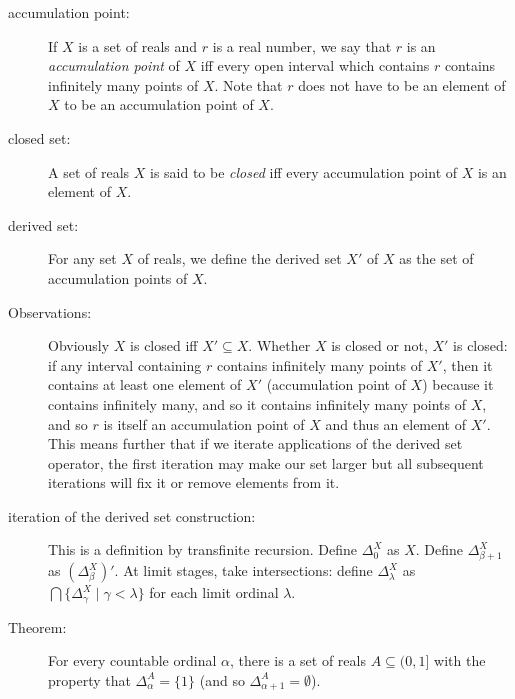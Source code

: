 \documentclass[12pt]{book}
\begin{document}
\begin{description}

\item[accumulation point:] If $X$ is a set of reals and $r$ is a real
number, we say that $r$ is an {\em accumulation point\/} of $X$ iff
every open interval which contains $r$ contains infinitely many points
of $X$.  Note that $r$ does not have to be an element of $X$ to be an
accumulation point of $X$.

\item[closed set:]  A set of reals $X$ is said to be {\em closed\/} iff
every accumulation point of $X$ is an element of $X$.

\item[derived set:] For any set $X$ of reals, we define the derived
set $X'$ of $X$ as the set of accumulation points of $X$.

\item[Observations:] Obviously $X$ is closed iff $X' \subseteq X$.
Whether $X$ is closed or not, $X'$ is closed: if any interval
containing $r$ contains infinitely many points of $X'$, then it
contains at least one element of $X'$ (accumulation point of $X$)
because it contains infinitely many, and so it contains infinitely
many points of $X$, and so $r$ is itself an accumulation point of $X$
and thus an element of $X'$.  This means further that if we iterate
applications of the derived set operator, the first iteration may make
our set larger but all subsequent iterations will fix it or remove
elements from it.

\item[iteration of the derived set construction:] This is a definition
by transfinite recursion.  Define $\Delta^X_0$ as $X$.  Define
$\Delta^X_{\beta+1}$ as $(\Delta^X_{\beta})'$.  At limit stages, take
intersections: define $\Delta^X_{\lambda}$ as
$\bigcap\{\Delta^X_{\gamma}\mid\gamma<\lambda\}$ for each limit
ordinal $\lambda$.

\item[Theorem:] For every countable ordinal $\alpha$, there is a set
of reals $A\subseteq (0,1]$ with the property that
$\Delta^A_{\alpha}=\{1\}$ (and so $\Delta^A_{\alpha+1}=\emptyset$).


\end{description}
\end{document}
